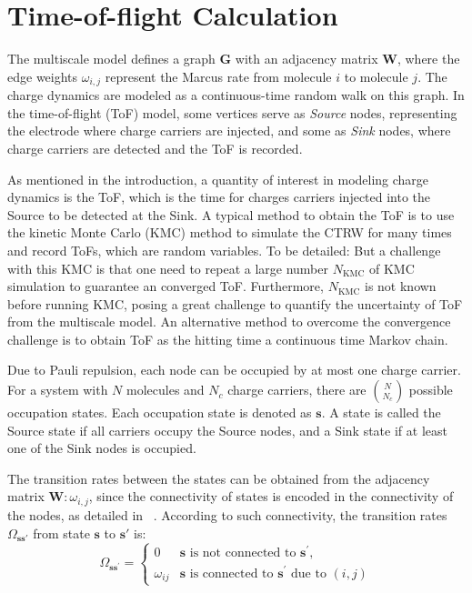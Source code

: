 \documentclass[letterpaper,12pt]{article}
\begin{document}
\section{Time-of-flight Calculation}
The multiscale model defines a graph $\mathbf{G}$ with an adjacency matrix $\mathbf{W}$, where the edge weights $\omega_{i,j}$ represent the Marcus rate from molecule $i$ to molecule $j$. The charge dynamics are modeled as a continuous-time random walk on this graph. In the time-of-flight (ToF) model, some vertices serve as \textit{Source} nodes, representing the electrode where charge carriers are injected, and some as \textit{Sink} nodes, where charge carriers are detected and the ToF is recorded.

As mentioned in the introduction, a quantity of interest in modeling charge dynamics is the ToF, which is the time for charges carriers injected into the Source to be detected at the Sink.
A typical method to obtain the ToF is to use the kinetic Monte Carlo (KMC) method to simulate the CTRW for many times and record ToFs, which are random variables. 
To be detailed: 
But a challenge with this KMC is that one need to repeat a large number $N_\text{KMC}$ of KMC simulation to guarantee an converged ToF. Furthermore, $N_\text{KMC}$ is not known before running KMC, posing a great challenge to quantify the uncertainty of ToF from the multiscale model. 
An alternative method to overcome the convergence challenge is to obtain ToF as the hitting time a continuous time Markov chain.

Due to Pauli repulsion, each node can be occupied by at most one charge carrier. For a system with $N$ molecules and $N_c$ charge carriers, there are ${N \choose N_c}$ possible occupation states. Each occupation state is denoted as $\mathbf{s}$. A state is called the Source state if all carriers occupy the Source nodes, and a Sink state if at least one of the Sink nodes is occupied.

The transition rates between the states can be obtained from the adjacency matrix $\mathbf{W}:\omega_{i,j}$, since the connectivity of states is encoded in the connectivity of the nodes, as detailed in ~\cite{chen_graph_2024}. 
According to such connectivity, 
the transition rates $\Omega_{\mathbf{s} \mathbf{s}' }$ from state $\mathbf{s}$ to $\mathbf{s}'$ is:
\begin{equation}\label{eq:transition_rates}
	\Omega_{\mathbf{s} \mathbf{s}^\prime} =
	\begin{cases}
	     0			&  \mathbf{s} \text{ is not connected to } \mathbf{s}^\prime,\\
	    \omega_{ij}	&  \mathbf{s} \text{ is connected to } \mathbf{s}^\prime \text{ due to } (i,j)
	\end{cases}
\end{equation}
\end{document}
